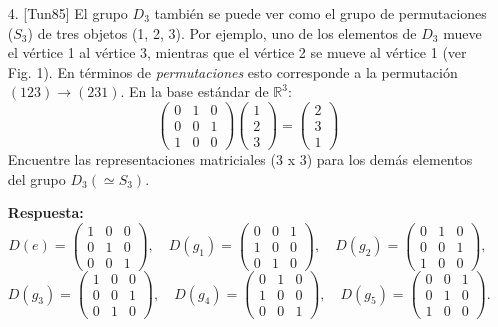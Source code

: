 \documentclass[a4paper,12pt]{article}
\begin{document}
\begin{enumerate}
    \item [4.] [Tun85] El grupo $D_3$ también se puede ver como el grupo de permutaciones ($S_3$) de tres objetos (1, 2, 3). Por ejemplo, uno de los elementos de $D_3$ mueve el vértice 1 al vértice 3, mientras que el vértice 2 se mueve al vértice 1 (ver Fig. 1). En términos de \textit{permutaciones} esto corresponde a la permutación $(123) \rightarrow (231)$. En la base estándar de $\mathbb{R}^3$:
    $$
    \begin{pmatrix} 0 & 1 & 0 \\ 0 & 0 & 1 \\ 1 & 0 & 0 \end{pmatrix} \begin{pmatrix} 1 \\ 2 \\ 3 \end{pmatrix} = \begin{pmatrix} 2 \\ 3 \\ 1 \end{pmatrix}
    $$
    Encuentre las representaciones matriciales (3 x 3) para los demás elementos del grupo $D_3 (\simeq S_3)$.

    \textbf{Respuesta:}
    $$
    D(e) = \begin{pmatrix} 1 & 0 & 0 \\ 0 & 1 & 0 \\ 0 & 0 & 1 \end{pmatrix}, \quad D(g_1) = \begin{pmatrix} 0 & 0 & 1 \\ 1 & 0 & 0 \\ 0 & 1 & 0 \end{pmatrix}, \quad D(g_2) = \begin{pmatrix} 0 & 1 & 0 \\ 0 & 0 & 1 \\ 1 & 0 & 0 \end{pmatrix},
    $$
    $$
    D(g_3) = \begin{pmatrix} 1 & 0 & 0 \\ 0 & 0 & 1 \\ 0 & 1 & 0 \end{pmatrix}, \quad D(g_4) = \begin{pmatrix} 0 & 1 & 0 \\ 1 & 0 & 0 \\ 0 & 0 & 1 \end{pmatrix}, \quad D(g_5) = \begin{pmatrix} 0 & 0 & 1 \\ 0 & 1 & 0 \\ 1 & 0 & 0 \end{pmatrix}.
    $$


\end{enumerate}
\end{document}

